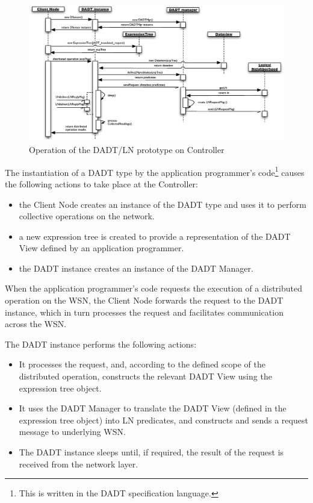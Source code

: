 \begin{figure}
\centering
\includegraphics[width=\textwidth]{img/SeqDiagram_PCnode.eps}
\caption[Operation of the DADT/LN prototype on Controller]{Operation of the DADT/LN prototype on Controller}
\label{Fig:SeqDiagram_PCnode}
\end{figure}

The instantiation of a DADT type by the application programmer's
code\footnote{This is written in the DADT specification language.} causes the
following actions to take place at the Controller:
\begin{itemize}
 \item the Client Node creates an instance of the DADT type and uses it 
 to perform collective operations on the network.
  \item a new expression tree
  is created to provide a representation of the DADT View defined by an application
  programmer.
  \item the DADT instance creates an instance of the DADT Manager.
\end{itemize}

When the application programmer's code requests the execution of a distributed operation
on the WSN, the Client Node forwards the request to the DADT instance, which in turn
processes the request and facilitates communication across the WSN.

The DADT instance performs the following actions:
  \begin{itemize} 
    \item It processes the request, and, according to the defined scope of the
    distributed operation, constructs the relevant DADT View using the
    expression tree object.
    \item It uses the DADT Manager to translate the DADT View
    (defined in the expression tree object) into LN predicates, and constructs and sends a request message to
    underlying WSN.
    \item The DADT instance sleeps until, if required, the result of
    the request is received from the network layer.
  \end{itemize}
  
